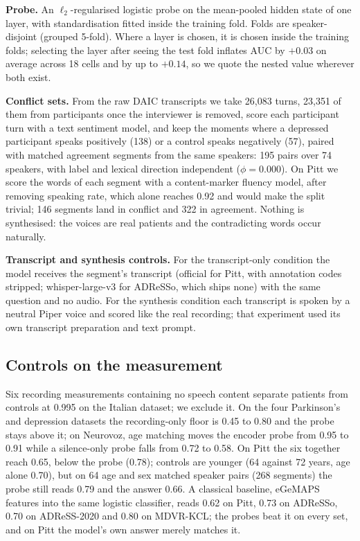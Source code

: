 \documentclass[conference]{IEEEtran}
\begin{document}
\noindent\textbf{Probe.} An $\ell_2$-regularised logistic probe on the mean-pooled hidden state of
one layer, with standardisation fitted inside the training fold. Folds are speaker-disjoint
(grouped 5-fold). Where a layer is chosen, it is chosen inside the training folds; selecting the
layer after seeing the test fold inflates AUC by $+0.03$ on average across 18 cells and by up to
$+0.14$, so we quote the nested value wherever both exist.

\noindent\textbf{Conflict sets.} From the raw DAIC transcripts we take 26{,}083 turns, 23{,}351 of
them from participants once the interviewer is removed, score each participant turn with a text
sentiment model, and keep the moments where a depressed participant speaks
positively (138) or a control speaks negatively (57), paired with matched agreement segments from
the same speakers: 195 pairs over 74 speakers, with label and lexical direction independent
($\phi = 0.000$). On Pitt we score the words of each segment with a content-marker fluency model,
after removing speaking rate, which alone reaches 0.92 and would make the split trivial; 146
segments land in conflict and 322 in agreement. Nothing is synthesised: the voices are real
patients and the contradicting words occur naturally.

\noindent\textbf{Transcript and synthesis controls.} For the transcript-only condition the model
receives the segment's transcript (official for Pitt, with annotation codes stripped; whisper-large-v3
\cite{whisper} for ADReSSo, which ships none) with the same question and no audio. For the synthesis condition each transcript is spoken by a neutral
Piper voice \cite{piper} and scored like the real recording; that experiment used its own transcript
preparation and text prompt.

\subsection{Controls on the measurement}\label{sec:controls}

Six recording
measurements containing no speech content separate patients from controls at 0.995 on the Italian
dataset; we exclude it. On the four Parkinson's and depression datasets the recording-only
floor is 0.45 to 0.80 and the probe stays above it; on Neurovoz, age matching moves the encoder
probe from 0.95 to 0.91 while a silence-only probe falls from 0.72 to 0.58. On Pitt the six together
reach 0.65, below the probe (0.78); controls are younger (64 against 72 years, age alone 0.70), but on
64 age and sex matched speaker pairs (268 segments) the probe still reads 0.79 and the answer 0.66. A
classical baseline, eGeMAPS features \cite{egemaps} into the same logistic classifier, reads
0.62 on Pitt, 0.73 on ADReSSo, 0.70 on ADReSS-2020 and 0.80 on MDVR-KCL; the probes beat it on every
set, and on Pitt the model's own answer merely matches it.
\end{document}
